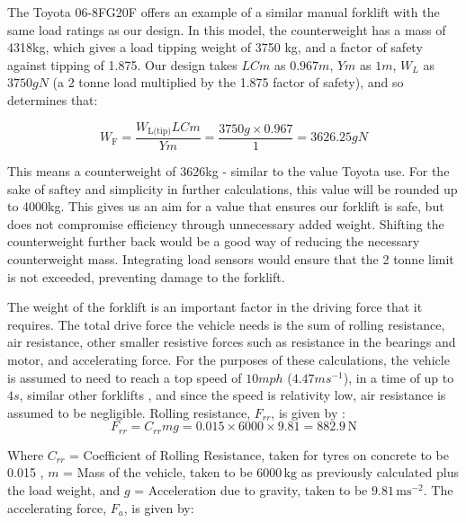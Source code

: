 \documentclass[12pt,titlepage]{article}
\begin{document}
The Toyota 06-8FG20F \cite{Toyota} offers an example of a similar manual forklift with the same load ratings as our design. In this model, the counterweight has a mass of 4318kg, which gives a load tipping weight of 3750 kg, and a factor of safety against tipping of 1.875. Our design takes $LCm$ as $0.967m$, $Ym$ as $1m$, $W_L$ as $3750gN$ (a 2 tonne load multiplied by the 1.875 factor of safety), and so determines that:

\vspace{-22pt}
\begin{equation}
    W_{\text{F}} = \frac{W_{\text{L(tip)}}LCm}{Ym} = \frac{3750g \times 0.967}{1} = 3626.25gN
\end{equation}
\vspace{-32pt}

This means a counterweight of 3626kg - similar to the value Toyota use. For the sake of saftey and simplicity in further calculations, this value will be rounded up to 4000kg. This gives us an aim for a value that ensures our forklift is safe, but does not compromise efficiency through unnecessary added weight. Shifting the  counterweight further back would be a good way of reducing the necessary counterweight mass. Integrating load sensors would ensure that the 2 tonne limit is not exceeded, preventing damage to the forklift.

The weight of the forklift is an important factor in the driving force that it requires. The total drive force the vehicle needs is the sum of rolling resistance, air resistance, other smaller resistive forces such as resistance in the bearings and motor, and accelerating force. For the purposes of these calculations, the vehicle is assumed to need to reach a top speed of $10mph$ ($4.47ms^{-1}$), in a time of up to $4s$, similar other forklifts \cite{Forklift_Acceleration_Example}, and since the speed is relativity low, air resistance is assumed to be negligible. Rolling resistance, $F_{rr}$, is given by \cite{Vehicle_Dynamics_And_Control}:
\vspace{-17pt}
\begin{equation}
    F_{rr} = C_{rr} m g = 0.015 \times 6000 \times 9.81 =  882.9 \, \text{N}
\end{equation}
\vspace{-37pt}

Where \( C_{rr} \) = Coefficient of Rolling Resistance, taken for tyres on concrete to be 0.015  \cite{RollingResistance}, \( m \) = Mass of the vehicle, taken to be \( 6000 \, \text{kg} \) as previously calculated plus the load weight, and \( g \) = Acceleration due to gravity, taken to be \( 9.81 \, \text{ms}^{-2} \). The accelerating force, \( F_a \), is given by:
\end{document}
